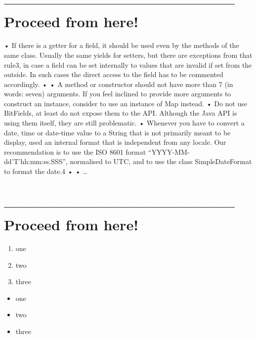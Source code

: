 \section{-------------------------------------------- Proceed from here!}
    • If there is a getter for a field, it should be used even by the methods of the same class. Usually the same yields for setters, but there are exceptions from that rule3, in case a field can be set internally to values that are invalid if set from the outside. In such cases the direct access to the field has to be commented accordingly.
    • 
    • A method or constructor should not have more than 7 (in words: seven) arguments. If you feel inclined to provide more arguments to construct an instance, consider to use an instance of Map instead.
    • Do not use BitFields, at least do not expose them to the API. Although the Java API is using them itself, they are still problematic.
    • Whenever you have to convert a date, time or date-time value to a String that is not primarily meant to be display, used an internal format that is independent from any locale. Our recommendation is to use the ISO 8601 format “YYYY-MM-dd'T'hh:mm:ss.SSS”, normalised to UTC, and to use the class SimpleDateFormat to format the date.4
    • 
    • …


\hrulefill\newpage 
\section{-------------------------------------------- Proceed from here!}
\lipsum[1]

\begin{enumerate}[label=P\arabic*.]
\item{one}
\item{two}
\item{three}
\end{enumerate}

\begin{itemize}[nosep]
\item{one}
\item{two}
\item{three}
\end{itemize}

\begin{lstlisting}[numbers=left]
\end{lstlisting}


